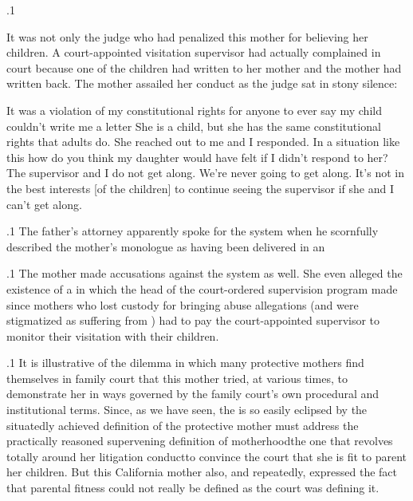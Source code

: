 \documentclass[11pt, twoside]{article}
\begin{document}
{{}%

\p.1{%
It was not only the judge who had penalized this mother for believing her children. A court-appointed visitation supervisor had actually
complained in court because one of the children had written to her
mother and the mother had written back. The mother assailed her
conduct as the judge sat in stony silence:

\begin{blockQuote}
It was a violation of my constitutional rights for anyone to ever say
my child couldn’t write me a letter\ellFour{2pt}{2pt} She is a child, but she has
the same constitutional rights that adults do. She reached out to
me and I responded. In a situation like this how do you think my
daughter would have felt if I didn’t respond to her? The supervisor
and I do not get along. We’re never going to get along. It’s not in the
best interests [of the children] to continue seeing the supervisor if
she and I can’t get along.
\end{blockQuote}

}%

\p.1{%
The father’s attorney apparently spoke for the system when he scornfully described the mother’s monologue as having been delivered in an
}%

\p.1{%
The mother made accusations against the system as well. She even alleged the existence of a  in which the head of the court-ordered
supervision program made  since mothers
who lost custody for bringing abuse allegations (and were stigmatized as
suffering from ) had to pay the court-appointed
supervisor to monitor their visitation with their children.
}%

\p.1{%
It is illustrative of the dilemma in which many protective mothers find
themselves in family court that this mother tried, at various times, to
demonstrate her  in ways governed by the family
court’s own procedural and institutional terms. Since, as we have seen,
the  is so easily eclipsed by the situatedly achieved
definition of  the protective mother must address
the practically reasoned supervening definition of motherhood\mdash{}the
one that revolves totally around her litigation conduct\mdash{}to convince the
court that she is fit to parent her children. But this California mother
also, and repeatedly, expressed the fact that parental fitness could not
really be defined as the court was defining it.
}%

}
\end{document}
